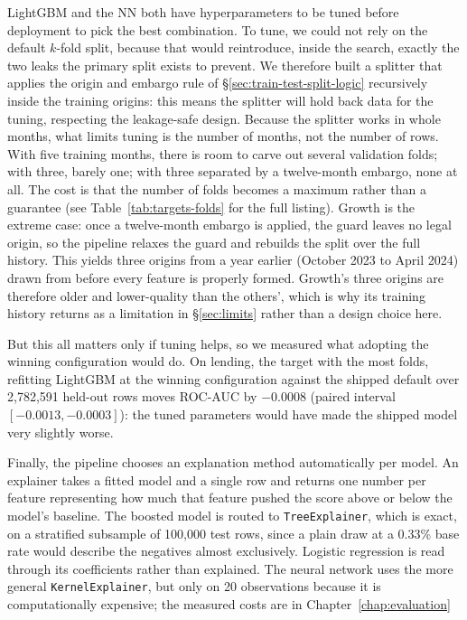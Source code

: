 \documentclass[    author={Samuel Menon Demelo; Sneha Saphala Ram Prasad; 
Viktor Ander Lindholm; Vishal Khatri},
               supervisor={Prof. Fernando Moreno-Pino},
                   degree={MSc},
                    title={Lloyds Commercial Banking Intelligence},
                 subtitle={Ranking SME Lending, Risk and Growth Prospects for Lloyds Banking Group},
                     type={},
                     year={2026}]{dissertation}
\begin{document}
LightGBM and the NN both have hyperparameters to be tuned before deployment to pick the best combination. To tune, we could not rely on the default $k$-fold split, because that would reintroduce, inside the search, exactly the two leaks the primary split exists to prevent. We therefore built a splitter that applies the origin and embargo rule of \S\ref{sec:train-test-split-logic} recursively inside the training origins: this means the splitter will hold back data for the tuning, respecting the leakage-safe design. Because the splitter works in whole months, what limits tuning is the number of months, not the number of rows. With five training months, there is room to carve out several validation folds; with three, barely one; with three separated by a twelve-month embargo, none at all. The cost is that the number of folds becomes a maximum rather than a guarantee (see Table~\ref{tab:targets-folds} for the full listing).
Growth is the extreme case: once a twelve-month embargo is applied, the guard leaves no legal origin, so the pipeline relaxes the guard and rebuilds the split over the full history. This yields three origins from a year earlier (October 2023 to April 2024) drawn from before every feature is properly formed. Growth's three origins are therefore older and lower-quality than the others', which is why its training history returns as a limitation in \S\ref{sec:limits} rather than a design choice here.

But this all matters only if tuning helps, so we measured what adopting the winning configuration would do. On lending, the target with the most folds, refitting LightGBM at the winning configuration against the shipped default over 2,782,591 held-out rows moves ROC-AUC by $-0.0008$ (paired interval $[-0.0013, -0.0003]$): the tuned parameters would have made the shipped model very slightly worse.

Finally, the pipeline chooses an explanation method automatically per model. An explainer takes a fitted model and a single row and returns one number per feature representing how much that feature pushed the score above or below the model's baseline. The boosted model is routed to \texttt{TreeExplainer}, which is exact, on a stratified subsample of 100,000 test rows, since a plain draw at a 0.33\% base rate would describe the negatives almost exclusively. Logistic regression is read through its coefficients rather than explained. The neural network uses the more general \texttt{KernelExplainer}, but only on 20 observations because it is computationally expensive; the measured costs are in Chapter~\ref{chap:evaluation}
\end{document}
